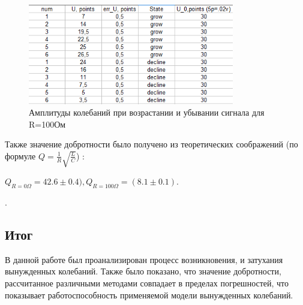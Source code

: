 \documentclass[a4paper,12pt]{article}
\begin{document}
\begin{figure}[ht]
\centering
\includegraphics[width=90mm]{tableA100.png}
\caption{Амплитуды колебаний при возрастании и убывании сигнала для R=100Ом}\label{tbaleA100)}
\end{figure}
\bigskip

Также значение добротности было получено из теоретических соображений (по формуле $Q = \frac{1}{R}\sqrt{\frac{L}{C}}$) : 

$Q_{R=0\Omega} = 42.6\pm0.4),     Q_{R=100\Omega} = (8.1\pm0.1)$.


\bigskip

\newpage
.
\newpage
\subsection*{Итог}
\bigskip
 
 В данной работе был проанализирован процесс возникновения, и затухания вынужденных колебаний. Также было показано, что значение добротности, рассчитанное различными методами совпадает в пределах погрешностей, что показывает работоспособность применяемой модели вынужденных колебаний.
\end{document}
